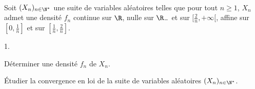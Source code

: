 
\begin{exerciceSP}~\\
  Soit $(X_n)_{n\in\N^*}$ une suite de variables aléatoires telles que
  pour tout $n\geq 1$, $X_n$ admet une densité $f_n$ continue sur
  $\R$, nulle sur $\R_-$ et sur $[\frac{2}{n}, +\infty [$, affine sur
  $[0, \frac{1}{n}]$ et sur $[ \frac{1}{n}, \frac{2}{n}]$.
  \begin{noliste}{1.}
    \setlength{\itemsep}{2mm}
  \item Déterminer une densité $f_n$ de $X_n$.
  \item Étudier la convergence en loi de la suite de variables
    aléatoires $(X_n)_{n\in\N^*}$.
  \end{noliste}
\end{exerciceSP} 



